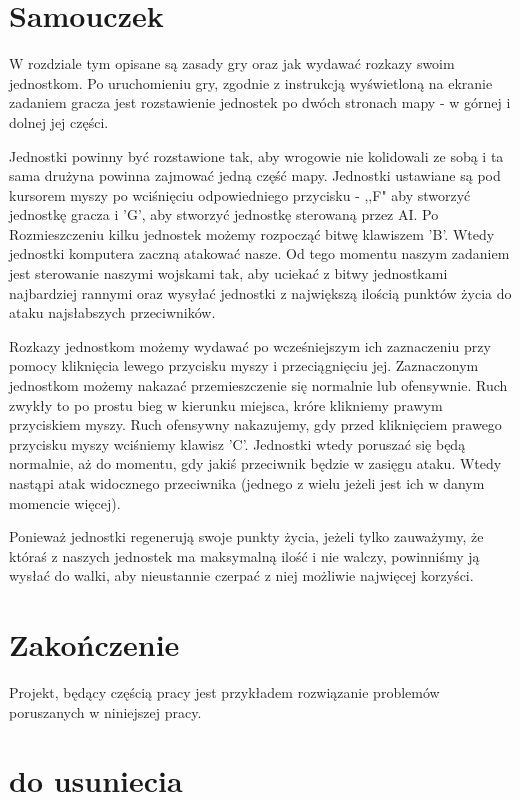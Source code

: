 \documentclass[12pt]{report}
\begin{document}
\section{Samouczek }
W rozdziale tym opisane są zasady gry oraz jak wydawać rozkazy swoim jednostkom.
Po uruchomieniu gry, zgodnie z instrukcją wyświetloną na ekranie zadaniem gracza jest rozstawienie jednostek po dwóch stronach mapy - w górnej i dolnej jej części. 

Jednostki powinny być rozstawione tak, aby wrogowie nie kolidowali ze sobą i ta sama drużyna powinna zajmować jedną część mapy. Jednostki ustawiane są pod kursorem myszy po wciśnięciu odpowiedniego przycisku - ,,F" aby stworzyć jednostkę gracza i 'G', aby stworzyć jednostkę sterowaną przez AI. Po Rozmieszczeniu kilku jednostek możemy rozpocząć bitwę klawiszem 'B'. Wtedy jednostki komputera zaczną atakować nasze. Od tego momentu naszym zadaniem jest sterowanie naszymi wojskami tak, aby uciekać z bitwy jednostkami najbardziej rannymi oraz wysyłać jednostki z największą ilością punktów życia do ataku najsłabszych przeciwników.

Rozkazy jednostkom możemy wydawać po wcześniejszym ich zaznaczeniu przy pomocy kliknięcia lewego przycisku myszy i przeciągnięciu jej. Zaznaczonym jednostkom możemy nakazać przemieszczenie się normalnie lub ofensywnie. Ruch zwykły to po prostu bieg w kierunku miejsca, króre klikniemy prawym przyciskiem myszy. Ruch ofensywny nakazujemy, gdy przed kliknięciem prawego przycisku myszy wciśniemy klawisz 'C'. Jednostki wtedy poruszać się będą normalnie, aż do momentu, gdy jakiś przeciwnik będzie w zasięgu ataku. Wtedy nastąpi atak widocznego przeciwnika (jednego z wielu jeżeli jest ich w danym momencie więcej).

Ponieważ jednostki regenerują swoje punkty życia, jeżeli tylko zauważymy, że któraś z naszych jednostek ma maksymalną ilość i nie walczy, powinniśmy ją wysłać do walki, aby nieustannie czerpać z niej możliwie najwięcej korzyści.

\section{Zakończenie}

Projekt, będący częścią pracy jest przykładem rozwiązanie problemów poruszanych w niniejszej pracy.


\section{do usuniecia}
\end{document}
